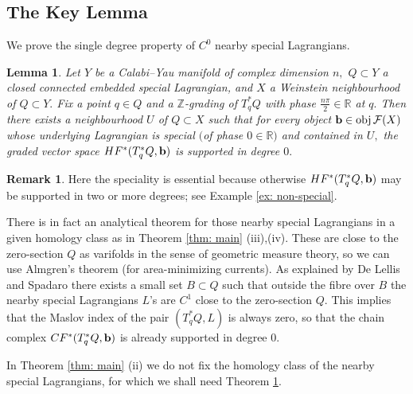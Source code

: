 \documentclass{article}
\theoremstyle{plain}%
\newtheorem{lem}[thm]{Lemma}
\theoremstyle{definition}
\newtheorem{rem}[thm]{Remark}
\numberwithin{equation}{section}
\numberwithin{figure}{section}
\def\l{\label}
\def\cF{{\mathbin{\cal F}}}
\def\R{{\mathbin{\mathbb R}}}
\def\Z{{\mathbin{\mathbb Z}}}
\begin{document}
\subsection{The Key Lemma}\l{sec: key lemma}
We prove the single degree property of $C^0$ nearby special Lagrangians. 
\begin{lem}\l{lem: single degree}
Let $Y$ be a Calabi--Yau manifold of complex dimension $n,$ $Q\subset Y$ a closed connected embedded special Lagrangian, and $X$ a Weinstein neighbourhood of $Q\subset Y.$ Fix a point $q\in Q$ and a $\Z$-grading of $T_q^*Q$ with phase $\frac{n\pi}2\in\R$ at $q.$ Then there exists a neighbourhood $U$ of $Q\subset X$ such that for every object $\b\in \obj\cF(X)$ whose underlying Lagrangian is special $($of phase $0\in\R)$ and contained in $U,$ the graded vector space $HF^*(T_q^*Q,{\mathbf{b}})$ is supported in degree $0.$
\end{lem}
\begin{rem}\l{rem: single degree}
Here the speciality is essential because otherwise $HF^*(T_q^*Q,{\mathbf{b}})$ may be supported in two or more degrees; see Example \ref{ex: non-special}.

There is in fact an analytical theorem for those nearby special Lagrangians in a given homology class as in Theorem \ref{thm: main} (iii),(iv). These are close to the zero-section $Q$ as varifolds in the sense of geometric measure theory, so we can use Almgren's theorem (for area-minimizing currents). As explained by De Lellis and Spadaro \cite[Theorem 2.4]{LS} there exists a small set $B\subset Q$ such that outside the fibre over $B$ the nearby special Lagrangians $L$'s are $C^1$ close to the zero-section $Q.$ This implies that the Maslov index of the pair $(T_q^*Q,L)$ is always zero, so that the chain complex $CF^*(T_q^*Q,{\mathbf{b}})$ is already supported in degree $0.$

In Theorem \ref{thm: main} (ii) we do not fix the homology class of the nearby special Lagrangians, for which we shall need Theorem \ref{lem: single degree}.
\end{rem}
\end{document}
